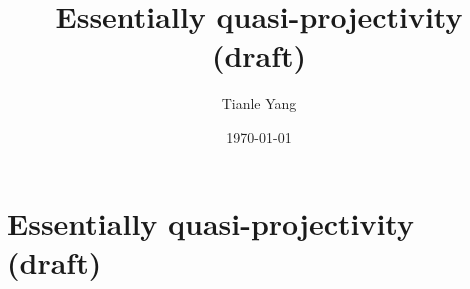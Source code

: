 \documentclass{noteformyself}
\title{Essentially quasi-projectivity (draft)}
\author{Tianle Yang}
\date{\today}
\begin{document}
    \maketitle

    \section{Essentially quasi-projectivity (draft)}

    

\end{document}
